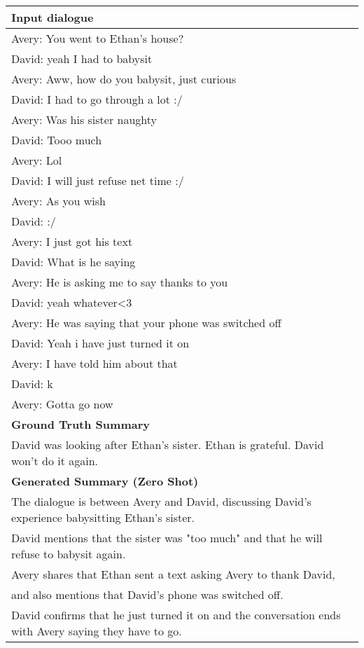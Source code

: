 \begin{table*}[]
\centering
\begin{tabular}{l}
\hline
\textbf{Input dialogue}\\ \hline
Avery: You went to Ethan's house? \\
David: yeah I had to babysit \\
Avery: Aww, how do you babysit, just curious \\
David: I had to go through a lot :/ \\
Avery: Was his sister naughty \\
David: Tooo much \\
Avery: Lol \\
David: I will just refuse net time :/ \\
Avery: As you wish \\
David: :/ \\
Avery: I just got his text \\
David: What is he saying\\
Avery: He is asking me to say thanks to you\\
David: yeah whatever<3\\
Avery: He was saying that your phone was switched off\\
David: Yeah i have just turned it on\\
Avery: I have told him about that\\
David: k\\
Avery: Gotta go now \\
\hline
\textbf{Ground Truth Summary} \\ \hline
David was looking after Ethan's sister. Ethan is grateful. David won't do it again. \\
\hline
\textbf{Generated Summary (Zero Shot)} \\ \hline
The dialogue is between Avery and David, discussing David's experience babysitting Ethan's sister. \\
David mentions that the sister was "too much" and that he will refuse to babysit again. \\
Avery shares that Ethan sent a text asking Avery to thank David, \\
and also mentions that David's phone was switched off. \\
David confirms that he just turned it on and the conversation ends with Avery saying they have to go.\\

\end{tabular}
\end{table*}
